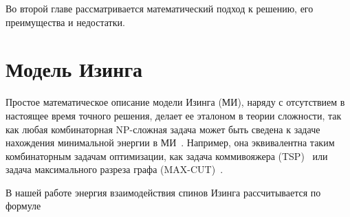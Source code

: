 \documentclass[utf8, babel, sor, jor, amsmath, amssymb, reprint]{elsarticle} %
\begin{document}
	Во второй главе рассматривается математический подход к решению, его преимущества и недостатки.
	
	

	\section{Модель Изинга}
	Простое математическое описание модели Изинга (МИ), наряду с отсутствием в настоящее время точного решения, делает ее эталоном в теории сложности, так как любая комбинаторная NP-сложная задача может быть сведена к задаче нахождения минимальной энергии в МИ~\cite{Markovich2019}. Например, она эквивалентна таким комбинаторным задачам оптимизации, как задача коммивояжера (TSP)~\cite{papadimitriou1977euclidean} или задача максимального разреза графа ({}MAX-CUT)~\cite{karp2010reducibility}.

	В нашей работе энергия взаимодействия спинов Изинга рассчитывается по формуле
\end{document}
